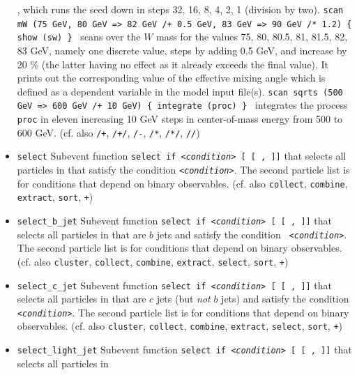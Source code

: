 \documentclass[12pt]{book}
\newcommand{\ttt}[1]{\texttt{#1}}
\begin{document}
\begin{itemize}
{}, which runs the seed down in steps 32, 16, 8, 4, 2, 1 (division by
two). \ttt{scan mW (75 GeV, 80 GeV => 82 GeV /+ 0.5 GeV,  83 GeV => 90
GeV /* 1.2) \{ show (sw) \} } scans over the $W$ mass for the values
75, 80, 80.5, 81, 81.5, 82, 83 GeV, namely one discrete value, steps
by adding 0.5 GeV, and increase by 20 \% (the latter having no effect
as it already exceeds the final value). It prints out the
corresponding value of the effective mixing angle which is defined as
a dependent variable in the model input file(s). \ttt{scan sqrts (500 GeV =>
  600 GeV /+ 10 GeV) \{ integrate (proc) \} } integrates the process
\ttt{proc} in eleven increasing 10 GeV steps in center-of-mass energy
from 500 to 600 GeV. (cf. also \ttt{/+}, \ttt{/+/}, \ttt{/-},
\ttt{/*}, \ttt{/*/}, \ttt{//})
\item
\ttt{select} \newline
Subevent function \ttt{select if {\em <condition>} [{\em <list1>} [ ,
  {\em <list2>}]]} that selects all particles in \ttt{{\em <list1>}}
that satisfy the condition \ttt{{\em <condition>}}. The second
particle list \ttt{{\em <list2>}} is for conditions that depend on
binary observables. (cf. also \ttt{collect},
\ttt{combine}, \ttt{extract}, \ttt{sort}, \ttt{+})
\item
\ttt{select\_b\_jet} \newline
Subevent function \ttt{select if {\em <condition>} [{\em <list1>} [ ,
  {\em <list2>}]]} that selects all particles in \ttt{{\em <list1>}}
that are $b$ jets and satisfy the condition \ttt{{\em
<condition>}}. The second particle list \ttt{{\em <list2>}} is for
conditions that depend on binary observables. (cf. also \ttt{cluster},
\ttt{collect}, \ttt{combine}, \ttt{extract}, \ttt{select},
\ttt{sort}, \ttt{+})
\item
\ttt{select\_c\_jet} \newline
Subevent function \ttt{select if {\em <condition>} [{\em <list1>} [ ,
  {\em <list2>}]]} that selects all particles in \ttt{{\em <list1>}}
that are $c$ jets (but {\em not} $b$ jets) and satisfy the condition
\ttt{{\em <condition>}}. The second particle list \ttt{{\em <list2>}}
is for conditions that depend on binary observables. (cf. also
\ttt{cluster}, \ttt{collect}, \ttt{combine}, \ttt{extract},
\ttt{select}, \ttt{sort}, \ttt{+})
\item
\ttt{select\_light\_jet} \newline
Subevent function \ttt{select if {\em <condition>} [{\em <list1>} [ ,
  {\em <list2>}]]} that selects all particles in \ttt{{\em <list1>}}

\end{itemize}
\end{document}
